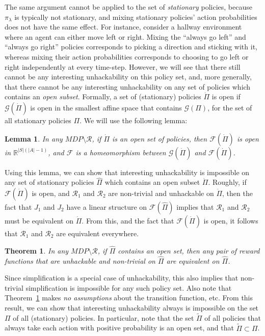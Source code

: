 \documentclass{article}
\newtheorem{theorem}{Theorem}
\newtheorem{lemma}{Lemma}
\theoremstyle{definition}
\theoremstyle{remark}
\begin{document}
The same argument cannot be applied to the set of \emph{stationary} policies, because $\pi_\lambda$ is typically not stationary, and mixing stationary policies' action probabilities does not have the same effect. 
For instance, consider a hallway environment where an agent can either move left or right. Mixing the ``always go left'' and ``always go right'' policies corresponds to picking a direction and sticking with it, whereas  mixing their action probabilities corresponds to choosing to go left or right independently at every time-step.
However, we will see that there still cannot be any interesting unhackability on this policy set, and, more generally, that there cannot be any interesting unhackability on any set of policies which contains an \emph{open subset}. Formally, a set of (stationary) policies $\dot{\Pi}$ is open if
$\mathcal{G}(\dot{\Pi})$ is open in the smallest affine space that contains $\mathcal{G}(\Pi)$, for the set of all stationary policies $\Pi$.
We will use the following lemma:




\begin{lemma}\label{lemma:homeomorphism}
In any $MDP \setminus \mathcal{R}$, if $\dot{\Pi}$ is an open set of policies, then
$\mathcal{F}(\dot{\Pi})$ is open in $\mathbb{R}^{|S|(|A|-1)}$, and $\mathcal{F}$ is a homeomorphism between $\mathcal{G}(\dot{\Pi})$ and $\mathcal{F}(\dot{\Pi})$. %
\end{lemma}

Using this lemma, we can show that interesting unhackability is impossible on any set of stationary policies $\hat{\Pi}$ which contains an open subset $\dot{\Pi}$. 
Roughly, if $\mathcal{F}(\dot{\Pi})$ is open, and $\mathcal{R}_1$ and $\mathcal{R}_2$ are non-trivial and unhackable on $\dot{\Pi}$, then the fact that $J_1$ and $J_2$ have a linear structure on $\mathcal{F}(\hat{\Pi})$ implies that $\mathcal{R}_1$ and $\mathcal{R}_2$ must be equivalent on $\dot{\Pi}$. From this, and the fact that $\mathcal{F}(\dot{\Pi})$ is open, it follows that $\mathcal{R}_1$ and $\mathcal{R}_2$ are equivalent everywhere.



\begin{theorem} \label{thm:open-set} %
In any $MDP \setminus \mathcal{R}$, if $\hat{\Pi}$ contains an open set, then any pair of reward functions that are unhackable and non-trivial on $\hat{\Pi}$ are equivalent on $\hat{\Pi}$.
\end{theorem}

Since simplification is a special case of unhackability, this also implies that non-trivial simplification is impossible for any such policy set. Also note that Theorem~\ref{thm:open-set} makes \emph{no assumptions} about the transition function, etc. From this result, we can show that interesting unhackability always is impossible on the set $\Pi$ of all (stationary) policies. In particular, note that the set $\tilde{\Pi}$ of all policies that always take each action with positive probability is an open set, and that $\tilde{\Pi} \subset \Pi$.
\end{document}

